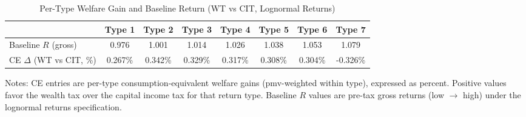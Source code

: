 \begin{table}[!htbp]
\centering
\caption{Per-Type Welfare Gain and Baseline Return (WT vs CIT, Lognormal Returns)}
\label{tab:ce_per_type_wt_vs_cit_lognorm}
\begin{threeparttable}
\begin{tabular}{lccccccc}
\toprule
& \textbf{Type 1} & \textbf{Type 2} & \textbf{Type 3} & \textbf{Type 4} & \textbf{Type 5} & \textbf{Type 6} & \textbf{Type 7} \\
\midrule
Baseline $R$ (gross) & 0.976 & 1.001 & 1.014 & 1.026 & 1.038 & 1.053 & 1.079 \\
CE $\Delta$ (WT vs CIT, \%) & 0.267\% & 0.342\% & 0.329\% & 0.317\% & 0.308\% & 0.304\% & -0.326\% \\
\bottomrule
\end{tabular}
\begin{tablenotes}[flushleft]
\footnotesize
\item Notes: CE entries are per-type consumption-equivalent welfare gains (pmv-weighted within type), expressed as percent. Positive values favor the wealth tax over the capital income tax for that return type. Baseline $R$ values are pre-tax gross returns (low $\rightarrow$ high) under the lognormal returns specification.
\end{tablenotes}
\end{threeparttable}
\end{table}
